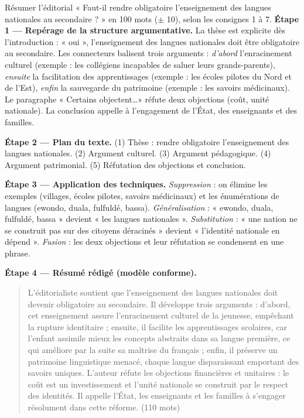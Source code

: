 \documentclass[11pt]{article}
\newcounter{popsec}
\newcounter{popsub}
\newcommand{\courssub}[1]{%
  \stepcounter{popsub}%
  \par\vspace{9pt}\noindent{\popxbold\fontsize{11.5}{13}\selectfont\color{popink}{\color{poporange}\thepopsec.\thepopsub}\hspace{6pt}#1}\par\nopagebreak\vspace{4pt}
}
\begin{document}
\courssub{Démarche et corrigé commenté}

\begin{exoresolu}
Résumer l'éditorial « Faut-il rendre obligatoire l'enseignement des langues nationales au secondaire ? » en 100 mots ($\pm$ 10), selon les consignes 1 à 7.
\tcblower
\textbf{Étape 1 — Repérage de la structure argumentative.} La thèse est explicite dès l'introduction : « oui », l'enseignement des langues nationales doit être obligatoire au secondaire. Les connecteurs balisent trois arguments : \emph{d'abord} l'enracinement culturel (exemple : les collégiens incapables de saluer leurs grands-parents), \emph{ensuite} la facilitation des apprentissages (exemple : les écoles pilotes du Nord et de l'Est), \emph{enfin} la sauvegarde du patrimoine (exemple : les savoirs médicinaux). Le paragraphe « Certains objectent\ldots » réfute deux objections (coût, unité nationale). La conclusion appelle à l'engagement de l'État, des enseignants et des familles.

\textbf{Étape 2 — Plan du texte.} (1) Thèse : rendre obligatoire l'enseignement des langues nationales. (2) Argument culturel. (3) Argument pédagogique. (4) Argument patrimonial. (5) Réfutation des objections et conclusion.

\textbf{Étape 3 — Application des techniques.} \emph{Suppression} : on élimine les exemples (villages, écoles pilotes, savoirs médicinaux) et les énumérations de langues (ewondo, duala, fulfuldé, bassa). \emph{Généralisation} : « ewondo, duala, fulfuldé, bassa » devient « les langues nationales ». \emph{Substitution} : « une nation ne se construit pas sur des citoyens déracinés » devient « l'identité nationale en dépend ». \emph{Fusion} : les deux objections et leur réfutation se condensent en une phrase.

\textbf{Étape 4 — Résumé rédigé (modèle conforme).}
\begin{quote}
L'éditorialiste soutient que l'enseignement des langues nationales doit devenir obligatoire au secondaire. Il développe trois arguments : d'abord, cet enseignement assure l'enracinement culturel de la jeunesse, empêchant la rupture identitaire ; ensuite, il facilite les apprentissages scolaires, car l'enfant assimile mieux les concepts abstraits dans sa langue première, ce qui améliore par la suite sa maîtrise du français ; enfin, il préserve un patrimoine linguistique menacé, chaque langue disparaissant emportant des savoirs uniques. L'auteur réfute les objections financières et unitaires : le coût est un investissement et l'unité nationale se construit par le respect des identités. Il appelle l'État, les enseignants et les familles à s'engager résolument dans cette réforme. (110 mots)
\end{quote}


\end{exoresolu}
\end{document}
